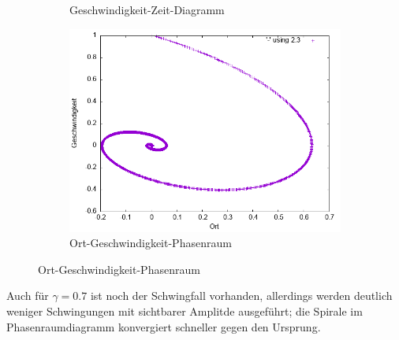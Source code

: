\documentclass[
    oneside,
    ngerman,
    footinclude=false,
    captions=tableheading,
    DIV=12
]{scrartcl}
\begin{document}
\begin{figure}[H]
\begin{subfigure}[b]{0.45\textwidth}
                        \caption{Geschwindigkeit-Zeit-Diagramm}
                        \label{fig:VVA1(a)-001-0.7-v}
                    \end{subfigure}
                    \begin{subfigure}[b]{0.45\textwidth}
                        \centering
                        \includegraphics[width=\textwidth]{Bilddateien/VVA1(b)-001-0.7-xv.png}
                        \caption{Ort-Geschwindigkeit-Phasenraum}
                        \label{fig:VVA1(a)-001-0.7-xv}
                    \end{subfigure}
                \end{figure}
                Auch für $\gamma=0.7$ ist noch der Schwingfall vorhanden, allerdings werden deutlich weniger Schwingungen mit sichtbarer Amplitde ausgeführt; die Spirale im Phasenraumdiagramm konvergiert schneller gegen den Ursprung.
                \newpage
            
\end{document}
